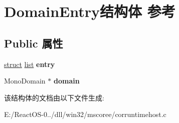 \hypertarget{struct_domain_entry}{}\section{Domain\+Entry结构体 参考}
\label{struct_domain_entry}
\subsection*{Public 属性}
\begin{DoxyCompactItemize}
\item 
\mbox{\label{struct_domain_entry_afbdfbc8235162f3de693e5517033c59b}} 
\hyperlink{interfacestruct}{struct} \hyperlink{classlist}{list} {\bfseries entry}
\item 
\mbox{\label{struct_domain_entry_aabc4f023c10bc4b3a17241dc7e8fee69}} 
Mono\+Domain $\ast$ {\bfseries domain}
\end{DoxyCompactItemize}


该结构体的文档由以下文件生成\+:\begin{DoxyCompactItemize}
\item 
E\+:/\+React\+O\+S-\/0../dll/win32/mscoree/corruntimehost.\+c\end{DoxyCompactItemize}
